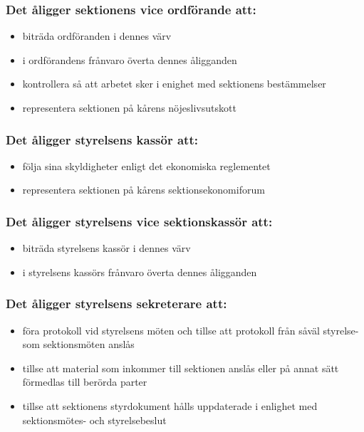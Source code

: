 \subsubsection{Det åligger sektionens vice ordförande att:}

\begin{itemize}
  \item biträda ordföranden i dennes värv 
  \item i ordförandens frånvaro överta dennes åligganden 
  \item kontrollera så att arbetet sker i enighet med sektionens bestämmelser 
  \item representera sektionen på kårens nöjeslivsutskott
\end{itemize}

\subsubsection{Det åligger styrelsens kassör att:}

\begin{itemize}
  \item följa sina skyldigheter enligt det ekonomiska reglementet
  \item representera sektionen på kårens sektionsekonomiforum
\end{itemize}

\subsubsection{Det åligger styrelsens vice sektionskassör att:}

\begin{itemize}
  \item biträda styrelsens kassör i dennes värv
  \item i styrelsens kassörs frånvaro överta dennes åligganden
\end{itemize}

\subsubsection{Det åligger styrelsens sekreterare att:}

\begin{itemize}
  \item föra protokoll vid styrelsens möten och tillse att protokoll från såväl styrelse- som sektionsmöten anslås
  \item tillse att material som inkommer till sektionen anslås eller på annat sätt förmedlas till berörda parter
  \item tillse att sektionens styrdokument hålls uppdaterade i enlighet med sektionsmötes- och styrelsebeslut
\end{itemize}

